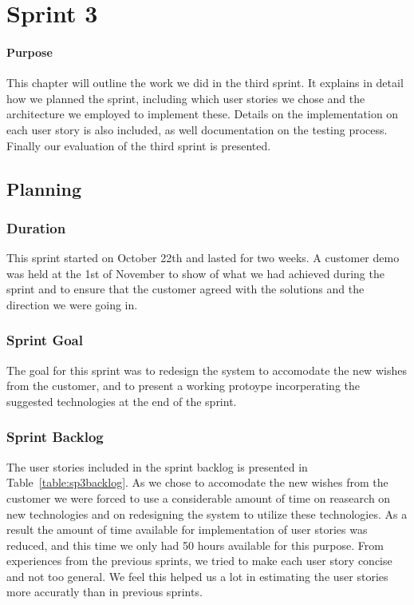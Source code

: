 \chapter{Sprint 3}

\minitoc

\subsubsection{Purpose}

This chapter will outline the work we did in the third sprint. It explains in detail how we planned the sprint, including which user stories we chose and the architecture we employed to implement these. Details on the implementation on each user story is also included, as well documentation on the testing process. Finally our evaluation of the third sprint is presented. 

\clearpage

\section{Planning}

\subsection{Duration}
This sprint started on October 22th and lasted for two weeks. A customer demo was held at the 1st of November to show of what we had achieved during the sprint and to ensure that the customer agreed with the solutions and the direction we were going in.

\subsection{Sprint Goal}
The goal for this sprint was to redesign the system to accomodate the new wishes from the customer, and to present a working protoype incorperating the suggested technologies at the end of the sprint.

\subsection{Sprint Backlog}
The user stories included in the sprint backlog is presented in Table~\ref{table:sp3backlog}. As we chose to accomodate the new wishes from the customer we were forced to use a considerable amount of time on reasearch on new technologies and on redesigning the system to utilize these technologies. As a result the amount of time available for implementation of user stories was reduced, and this time we only had 50 hours available for this purpose. From experiences from the previous sprints, we tried to make each user story concise and not too general. We feel this helped us a lot in estimating the user stories more accuratly than in previous sprints.

